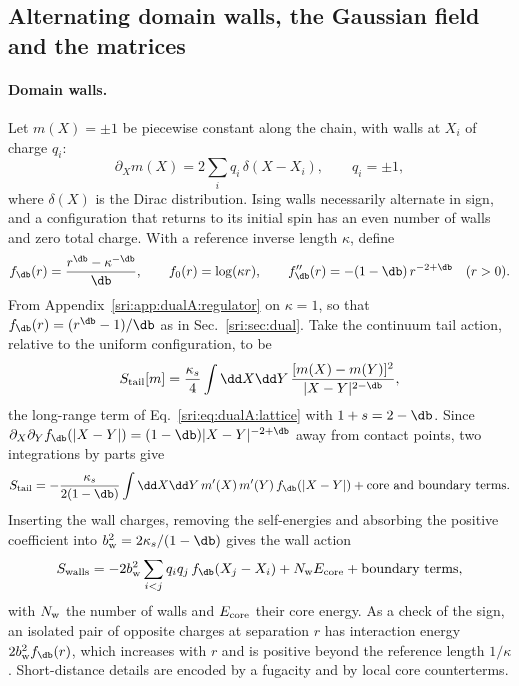 \subsection{Alternating domain walls, the Gaussian field and the matrices}\label{sri:app:dualA:gas}
\paragraph{Domain walls.} Let $m(X)=\pm1$ be piecewise constant along the chain, with walls at $X_i$ of charge
$q_i$:
\begin{equation}
 \partial_Xm(X)=2\sum_iq_i\,\delta(X-X_i),\qquad q_i=\pm1,
\end{equation}
where $\delta(X)$ is the Dirac distribution. Ising walls necessarily alternate in sign, and a configuration that
returns to its initial spin has an even number of walls and zero total charge. With a reference inverse length
$\kappa$, define
\begin{equation}
 f_{\db}(r)=\frac{r^{\db}-\kappa^{-\db}}{\db},\qquad f_0(r)=\log(\kappa r),\qquad
 f_{\db}''(r)=-(1-\db)\,r^{-2+\db}\quad(r>0).
 \label{sri:eq:dualA:fdb}
\end{equation}
From Appendix~\ref{sri:app:dualA:regulator} on $\kappa=1$, so that $f_{\db}(r)=(r^{\db}-1)/\db$ as in
Sec.~\ref{sri:sec:dual}. Take the continuum tail action, relative to the uniform configuration, to be
\begin{equation}
 S_{\rm tail}[m]=\frac{\kappa_s}{4}\int\dd X\dd Y\,\frac{[m(X)-m(Y)]^2}{|X-Y|^{2-\db}},
\end{equation}
the long-range term of Eq.~\eqref{sri:eq:dualA:lattice} with $1+s=2-\db$. Since
$\partial_X\partial_Yf_{\db}(|X-Y|)=(1-\db)|X-Y|^{-2+\db}$ away from contact points, two integrations by parts give
\begin{equation}
 S_{\rm tail}=-\frac{\kappa_s}{2(1-\db)}\int\dd X\dd Y\,m'(X)\,m'(Y)\,f_{\db}(|X-Y|)+\text{core and boundary terms}.
\end{equation}
Inserting the wall charges, removing the self-energies and absorbing the positive coefficient into
$b_{\rm w}^2=2\kappa_s/(1-\db)$ gives the wall action
\begin{equation}
 S_{\rm walls}=-2b_{\rm w}^2\sum_{i<j}q_iq_j\,f_{\db}(X_j-X_i)+N_{\rm w}E_{\rm core}+\text{boundary terms},
 \label{sri:eq:dualA:wallaction}
\end{equation}
with $N_{\rm w}$ the number of walls and $E_{\rm core}$ their core energy. As a check of the sign, an isolated pair
of opposite charges at separation $r$ has interaction energy $2b_{\rm w}^2f_{\db}(r)$, which increases with $r$ and is
positive beyond the reference length $1/\kappa$. Short-distance details are encoded by a fugacity and by local core
counterterms.

